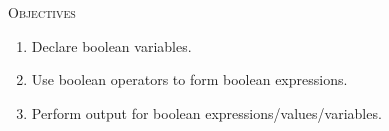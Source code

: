 


\renewcommand\TITLE{Assignment 5}
\usepackage{import}


\topmatter

\textsc{Objectives}
 \begin{enumerate}[nosep]      
   \item Declare boolean variables.
   \item Use boolean operators to form boolean expressions.
   \item Perform output for boolean expressions/values/variables.
 \end{enumerate}





